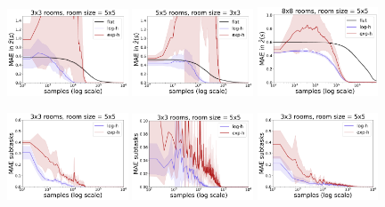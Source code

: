   \begin{figure}
  \centering
  \includegraphics*[width=0.32\textwidth]{figures/chapter2/online/nrooms_3_3_1.png}
  \includegraphics*[width=0.32\textwidth]{figures/chapter2/online/nrooms_5_5_1.png}
  \includegraphics*[width=0.32\textwidth]{figures/chapter2/online/nrooms_8_8_1.png}

  \includegraphics*[width=0.32\textwidth]{figures/chapter2/online/nrooms_3_3_subtasks_1.png}
  \includegraphics*[width=0.32\textwidth]{figures/chapter2/online/nrooms_5_5_subtasks_1.png}
  \includegraphics*[width=0.32\textwidth]{figures/chapter2/online/nrooms_8_8_subtasks_1.png}


\end{figure}
